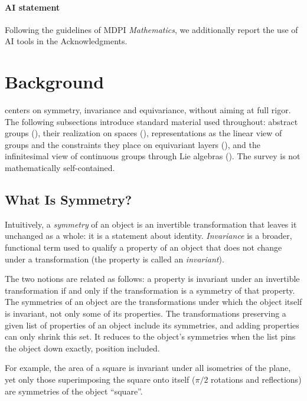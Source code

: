 \documentclass[mathematics,review,submit,moreauthors]{Definitions/mdpi}
\begin{document}
\paragraph{AI statement}
Following the guidelines of MDPI \textit{Mathematics}, we additionally report the use of AI tools in the Acknowledgments.




\section{Background}\label{sec:background}
 centers on symmetry, invariance and equivariance, without aiming at full rigor.
The following subsections introduce standard material used throughout: abstract groups (), their realization on spaces (), representations as the linear view of groups and the constraints they place on equivariant layers (), and the infinitesimal view of continuous groups through Lie algebras ().
The survey is not mathematically self-contained.

\subsection{What Is Symmetry?}\label{sec:what-is-sym}
Intuitively, a \emph{symmetry} of an object is an invertible transformation that leaves it unchanged as a whole: it is a statement about identity.
\emph{Invariance} is a broader, functional term used to qualify a property of an object that does not change under a transformation (the property is called an \emph{invariant}).

The two notions are related as follows: a property is invariant under an invertible transformation if and only if the transformation is a symmetry of that property. The symmetries of an object are the transformations under which the object itself is invariant, not only some of its properties. The transformations preserving a given list of properties of an object include its symmetries, and adding properties can only shrink this set. It reduces to the object's symmetries when the list pins the object down exactly, position included.

For example, the area of a square is invariant under all isometries of the plane, yet only those superimposing the square onto itself ($\pi/2$ rotations and reflections) are symmetries of the object ``square''.
\end{document}
